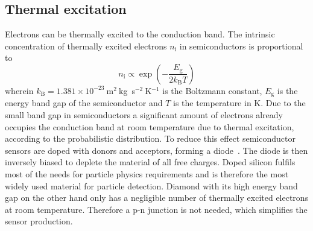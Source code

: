 

\subsection{Thermal excitation}
Electrons can be thermally excited to the conduction band. The intrinsic concentration of thermally excited electrons $n_\mathrm{i}$ in semiconductors is proportional to~\cite{PHSEM:00000}
\begin{equation}
\label{eq:intrinsiccarrier}
n_\mathrm{i} \propto \exp\left(-\frac{E_\mathrm{g}}{2k_\mathrm{B}T}\right)
\end{equation} 
wherein $k_\mathrm{B} = 1.381\times10^{-23}~$m$^2~$kg~s$^{-2}~$K$^{-1}$ is the Boltzmann constant, $E_\mathrm{g}$ is the energy band gap of the semiconductor and $T$ is the temperature in K.
Due to the small band gap in semiconductors a significant amount of electrons already occupies the conduction band at room temperature due to thermal excitation, according to the probabilistic distribution. To reduce this effect semiconductor sensors are doped with donors and acceptors, forming a diode~\cite{PHSEM:00000}. The diode is then inversely biased to deplete the material of all free charges. Doped silicon fulfils most of the needs for particle physics requirements and is therefore the most widely used material for particle detection. Diamond with its high energy band gap on the other hand only has a negligible number of thermally excited electrons at room temperature. Therefore a p-n junction is not needed, which simplifies the sensor production.

 

